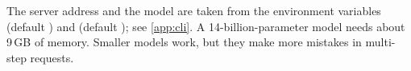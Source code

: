 The server address and the model are taken from the environment variables
 (default ) and 
(default ); see \cref{app:cli}. A 14-billion-parameter model needs about 9\,GB
of memory. Smaller models work, but they make more mistakes in multi-step requests.

